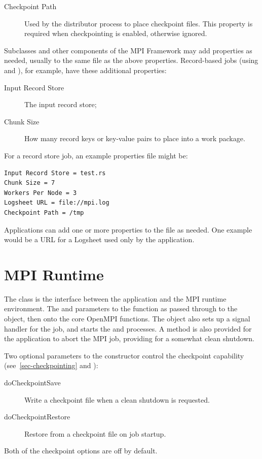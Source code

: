 \begin{description}
\item[Checkpoint Path] Used by the distributor process to place checkpoint
files.
This property is required when checkpointing is enabled, otherwise ignored.
\end{description}

Subclasses and other components of the MPI Framework may add properties as
needed, usually to the same file as the above properties. Record-based jobs
(using  and ), for example,
have these additional properties:

\begin{description}
\item[Input Record Store] The input record store;
\item[Chunk Size] How many record keys or key-value pairs to place into a
work package.
\end{description}

For a record store job, an example properties file might be:
\begin{verbatim}
Input Record Store = test.rs
Chunk Size = 7
Workers Per Node = 3
Logsheet URL = file://mpi.log
Checkpoint Path = /tmp
\end{verbatim}

Applications can add one or more properties to the file as needed. One example
would be a URL for a Logsheet used only by the application.

\section{MPI Runtime}
\label{sec-mpiruntime}

The  class is the interface between the application and the
MPI runtime environment. The  and  parameters
to the  function as passed through to the 
object, then onto the core OpenMPI functions. The  object 
also sets up a signal handler for the job, and starts the 
and  processes.  A method is also provided for the application
to abort the MPI job, providing for a somewhat clean shutdown.

Two optional parameters to the  constructor control the
checkpoint capability (see~\ref{sec-checkpointing} and ):
\begin{description}
\item[doCheckpointSave] Write a checkpoint file when a clean shutdown is
requested.
\item[doCheckpointRestore] Restore from a checkpoint file on job startup.
\end{description}
Both of the checkpoint options are off by default.

